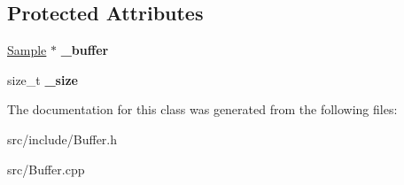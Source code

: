 \subsection*{Protected Attributes}
\begin{DoxyCompactItemize}
\item 
\hypertarget{class_buffer_ad36dd6d3bab0c9fa68619f5a004e85ea}{\hyperlink{class_sample}{Sample} $\ast$ {\bfseries \+\_\+buffer}}\label{class_buffer_ad36dd6d3bab0c9fa68619f5a004e85ea}

\item 
\hypertarget{class_buffer_abf931dd3bb6a74e4e44c7d92e12b1969}{size\+\_\+t {\bfseries \+\_\+size}}\label{class_buffer_abf931dd3bb6a74e4e44c7d92e12b1969}

\end{DoxyCompactItemize}


The documentation for this class was generated from the following files\+:\begin{DoxyCompactItemize}
\item 
src/include/Buffer.\+h\item 
src/Buffer.\+cpp\end{DoxyCompactItemize}
